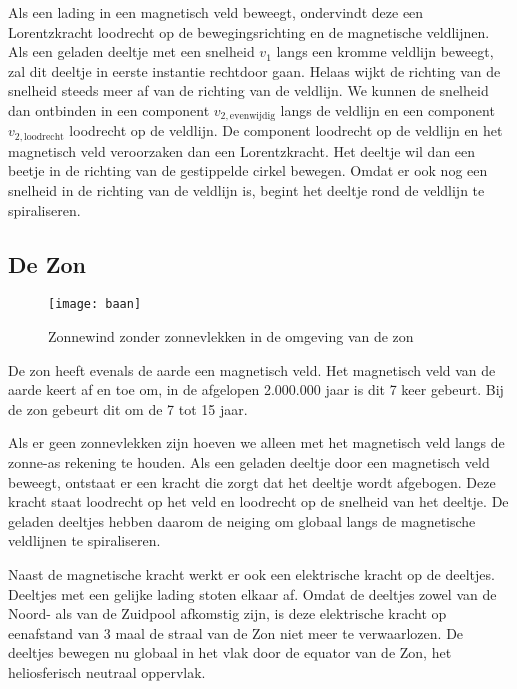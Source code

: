 Als een lading in een magnetisch veld beweegt, ondervindt deze een
Lorentzkracht loodrecht op de bewegingsrichting en de magnetische
veldlijnen. Als een geladen deeltje met een snelheid $v_{1}$ langs
een kromme veldlijn beweegt, zal dit deeltje in eerste instantie rechtdoor
gaan. Helaas wijkt de richting van de snelheid steeds meer af van
de richting van de veldlijn. We kunnen de snelheid dan ontbinden in
een component $v_{2,\mathrm{evenwijdig}}$ langs de veldlijn en een
component $v_{2,\mathrm{loodrecht}}$ loodrecht op de veldlijn. De
component loodrecht op de veldlijn en het magnetisch veld veroorzaken
dan een Lorentzkracht. Het deeltje wil dan een beetje in de richting
van de gestippelde cirkel bewegen. Omdat er ook nog een snelheid in
de richting van de veldlijn is, begint het deeltje rond de veldlijn
te spiraliseren.


\subsection{De Zon}

\begin{figure}[h]
\noindent \begin{centering}
\texttt{[image: baan]}
\par\end{centering}

\caption{Zonnewind zonder zonnevlekken in de omgeving van de zon}
\end{figure}


De zon heeft evenals de aarde een magnetisch veld. Het magnetisch
veld van de aarde keert af en toe om, in de afgelopen 2.000.000 jaar
is dit 7 keer gebeurt. Bij de zon gebeurt dit om de 7 tot 15 jaar. 

Als er geen zonnevlekken zijn hoeven we alleen met het magnetisch
veld langs de zonne-as rekening te houden. Als een geladen deeltje
door een magnetisch veld beweegt, ontstaat er een kracht die zorgt
dat het deeltje wordt afgebogen. Deze kracht staat loodrecht op het
veld en loodrecht op de snelheid van het deeltje. De geladen deeltjes
hebben daarom de neiging om globaal langs de magnetische veldlijnen
te spiraliseren.

Naast de magnetische kracht werkt er ook een elektrische kracht op
de deeltjes. Deeltjes met een gelijke lading stoten elkaar af. Omdat
de deeltjes zowel van de Noord- als van de Zuidpool afkomstig zijn,
is deze elektrische kracht op eenafstand van 3 maal de straal van
de Zon niet meer te verwaarlozen. De deeltjes bewegen nu globaal in
het vlak door de equator van de Zon, het heliosferisch neutraal oppervlak.

